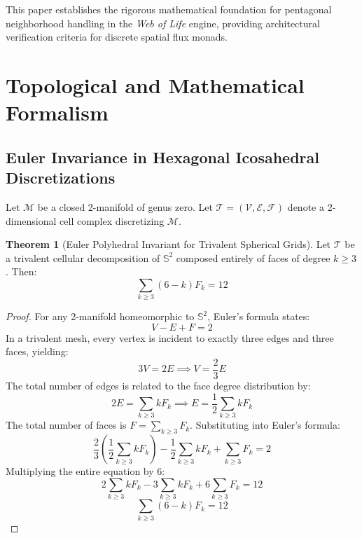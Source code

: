 \documentclass[11pt,a4paper]{article}
\theoremstyle{definition}
\newtheorem{theorem}{Theorem}
\begin{document}
This paper establishes the rigorous mathematical foundation for pentagonal neighborhood handling in the \textit{Web of Life} engine, providing architectural verification criteria for discrete spatial flux monads.

\section{Topological and Mathematical Formalism}

\subsection{Euler Invariance in Hexagonal Icosahedral Discretizations}
Let $\mathcal{M}$ be a closed 2-manifold of genus zero. Let $\mathcal{T} = (\mathcal{V}, \mathcal{E}, \mathcal{F})$ denote a 2-dimensional cell complex discretizing $\mathcal{M}$.

\begin{theorem}[Euler Polyhedral Invariant for Trivalent Spherical Grids]
Let $\mathcal{T}$ be a trivalent cellular decomposition of $\mathbb{S}^2$ composed entirely of faces of degree $k \ge 3$. Then:
\begin{equation}
\sum_{k \ge 3} (6 - k) F_k = 12
\end{equation}
\end{theorem}

\begin{proof}
For any 2-manifold homeomorphic to $\mathbb{S}^2$, Euler's formula states:
\begin{equation}
V - E + F = 2
\end{equation}
In a trivalent mesh, every vertex is incident to exactly three edges and three faces, yielding:
\begin{equation}
3V = 2E \implies V = \frac{2}{3}E
\end{equation}
The total number of edges is related to the face degree distribution by:
\begin{equation}
2E = \sum_{k \ge 3} k F_k \implies E = \frac{1}{2} \sum_{k \ge 3} k F_k
\end{equation}
The total number of faces is $F = \sum_{k \ge 3} F_k$. Substituting into Euler's formula:
\begin{equation}
\frac{2}{3} \left( \frac{1}{2} \sum_{k \ge 3} k F_k \right) - \frac{1}{2} \sum_{k \ge 3} k F_k + \sum_{k \ge 3} F_k = 2
\end{equation}
Multiplying the entire equation by $6$:
\begin{equation}
2 \sum_{k \ge 3} k F_k - 3 \sum_{k \ge 3} k F_k + 6 \sum_{k \ge 3} F_k = 12
\end{equation}
\begin{equation}
\sum_{k \ge 3} (6 - k) F_k = 12
\end{equation}
\end{proof}
\end{document}

